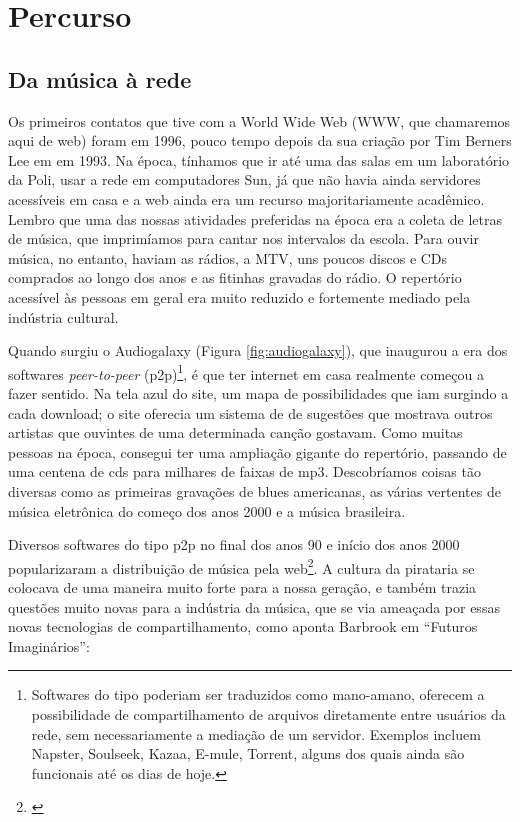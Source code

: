 
\chapter{Percurso}
\label{ch:percurso}


\section{Da música à rede}
    
Os primeiros contatos que tive com a World Wide Web (WWW, que chamaremos aqui de web) foram em 1996, pouco tempo depois da sua criação por Tim Berners Lee em em 1993. Na época, tínhamos que ir até uma das salas em um laboratório da Poli, usar a rede em computadores Sun, já que não havia ainda servidores acessíveis em casa e a web ainda era um recurso majoritariamente acadêmico. Lembro que uma das nossas atividades preferidas na época era a coleta de letras de música, que imprimíamos para cantar nos intervalos da escola. Para ouvir música, no entanto, haviam as rádios, a MTV, uns poucos discos e CDs comprados ao longo dos anos e as fitinhas gravadas do rádio. O repertório acessível às pessoas em geral era muito reduzido e fortemente mediado pela indústria cultural.

Quando surgiu o Audiogalaxy (Figura \ref{fig:audiogalaxy}), que inaugurou a era dos softwares \emph{peer-to-peer} (p2p)\footnote{Softwares do tipo poderiam ser traduzidos como mano-amano, oferecem a possibilidade de compartilhamento de arquivos diretamente entre usuários da rede, sem necessariamente a mediação de um servidor. Exemplos incluem Napster, Soulseek, Kazaa, E-mule, Torrent, alguns dos quais ainda são funcionais até os dias de hoje.}, é que ter internet em casa realmente começou a fazer sentido. Na tela azul do site, um mapa de possibilidades que iam surgindo a cada download; o site oferecia um sistema de de sugestões que mostrava outros artistas que ouvintes de uma determinada canção gostavam. Como muitas pessoas na época, consegui ter uma ampliação gigante do repertório, passando de uma centena de cds para milhares de faixas de mp3. Descobríamos coisas tão diversas como as primeiras gravações de blues americanas, as várias vertentes de música eletrônica do começo dos anos 2000 e a música brasileira. 

Diversos softwares do tipo p2p no final dos anos 90 e início dos anos 2000 popularizaram a distribuição de música pela web\footnote{\cite{Castro2008}}.  A cultura da pirataria se colocava de uma maneira muito forte para a nossa geração, e também trazia questões muito novas para a indústria da música, que se via ameaçada por essas novas tecnologias de compartilhamento, como aponta Barbrook em ``Futuros Imaginários'':
    
